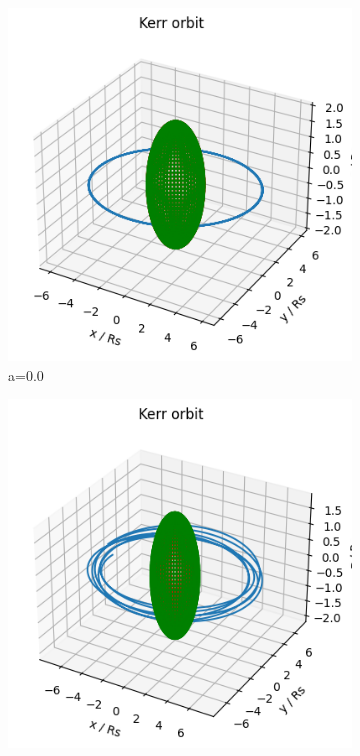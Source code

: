 \documentclass{article}
\begin{document}
\begin{figure}[h]
     \centering
     \begin{subfigure}[b]{0.3\textwidth}
         \centering
         \includegraphics[width=\textwidth]{images/kerr_a=0_del.png}
         \caption{a=0.0}
         \label{fig:Kerr orbit, a=0}
     \end{subfigure}
     \hfill
     \begin{subfigure}[b]{0.3\textwidth}
         \centering
         \includegraphics[width=\textwidth]{images/kerr_a=0.5.png}

\end{subfigure}
\end{figure}
\end{document}
